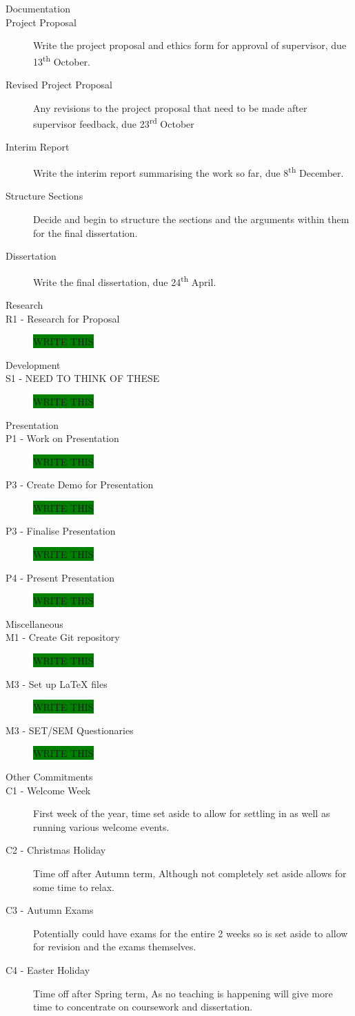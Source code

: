 \documentclass[a4paper]{article}
\begin{document}
\begin{description}
\item [\large{Documentation}]
\item [Project Proposal]
Write the project proposal and ethics form for approval of supervisor, due 13\textsuperscript{th} October.
\item [Revised Project Proposal]
Any revisions to the project proposal that need to be made after supervisor feedback, due 23\textsuperscript{rd} October
\item [Interim Report]
Write the interim report summarising the work so far, due 8\textsuperscript{th} December.
\item [Structure Sections]
Decide and begin to structure the sections and the arguments within them for the final dissertation.
\item [Dissertation]
Write the final dissertation, due 24\textsuperscript{th} April.

\item [\large{Research}]
\item [R1 - Research for Proposal]
\colorbox{green}{WRITE THIS}

\item [\large{Development}]
\item [S1 - NEED TO THINK OF THESE]
\colorbox{green}{WRITE THIS}

\item [\large{Presentation}]
\item [P1 - Work on Presentation]
\colorbox{green}{WRITE THIS}
\item [P3 - Create Demo for Presentation]
\colorbox{green}{WRITE THIS}
\item [P3 - Finalise Presentation]
\colorbox{green}{WRITE THIS}
\item [P4 - Present Presentation]
\colorbox{green}{WRITE THIS}

\item [\large{Miscellaneous}]
\item [M1 - Create Git repository]
\colorbox{green}{WRITE THIS}
\item [M3 - Set up LaTeX files]
\colorbox{green}{WRITE THIS}
\item [M3 - SET/SEM Questionaries]
\colorbox{green}{WRITE THIS}

\item [\large{Other Commitments}]
\item [C1 - Welcome Week]
First week of the year, time set aside to allow for settling in as well as running various welcome events.
\item [C2 - Christmas Holiday]
Time off after Autumn term, Although not completely set aside allows for some time to relax.
\item [C3 - Autumn Exams]
Potentially could have exams for the entire 2 weeks so is set aside to allow for revision and the exams themselves.
\item [C4 - Easter Holiday]
Time off after Spring term, As no teaching is happening will give more time to concentrate on coursework and dissertation.
\end{description}
\end{document}
